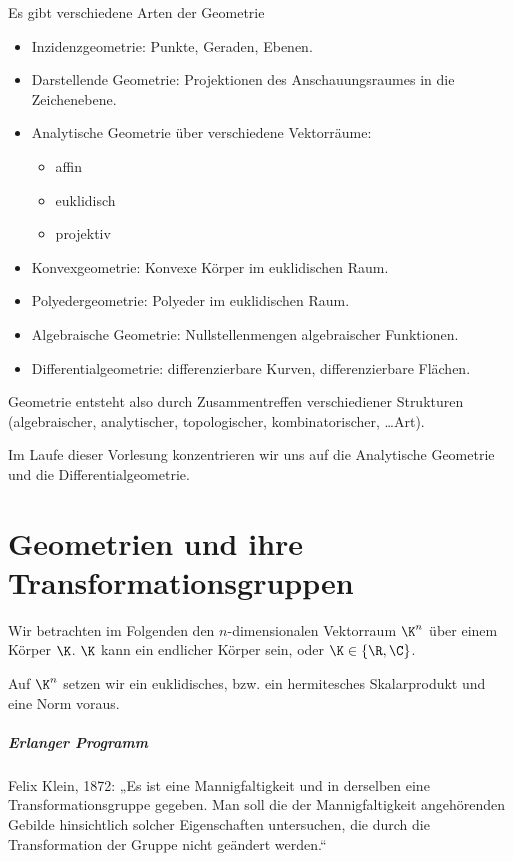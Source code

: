 
Es gibt verschiedene Arten der Geometrie

\begin{itemize}
	\item
		Inzidenzgeometrie: Punkte, Geraden, Ebenen.
	\item
		Darstellende Geometrie: Projektionen des Anschauungsraumes in die Zeichenebene.
	\item
		Analytische Geometrie über verschiedene Vektorräume:
		\begin{itemize}
			\item
				affin
			\item
				euklidisch
			\item
				projektiv
		\end{itemize}
	\item
		Konvexgeometrie: Konvexe Körper im euklidischen Raum.
	\item
		Polyedergeometrie: Polyeder im euklidischen Raum.
	\item
		Algebraische Geometrie: Nullstellenmengen algebraischer Funktionen.
	\item
		Differentialgeometrie: differenzierbare Kurven, differenzierbare Flächen.
\end{itemize}
Geometrie entsteht also durch Zusammentreffen verschiediener Strukturen (algebraischer, analytischer, topologischer, kombinatorischer, \dots Art).

Im Laufe dieser Vorlesung konzentrieren wir uns auf die Analytische Geometrie und die Differentialgeometrie.


\chapter{Geometrien und ihre Transformationsgruppen}


Wir betrachten im Folgenden den $n$-dimensionalen Vektorraum $\K^n$ über einem Körper $\K$.
$\K$ kann ein endlicher Körper sein, oder $\K \in \{\R, \C\}$.

Auf $\K^n$ setzen wir ein euklidisches, bzw. ein hermitesches Skalarprodukt und eine Norm voraus.

\paragraph{Erlanger Programm}

Felix Klein, 1872: „Es ist eine Mannigfaltigkeit und in derselben eine Transformationsgruppe gegeben.
Man soll die der Mannigfaltigkeit angehörenden Gebilde hinsichtlich solcher Eigenschaften untersuchen, die durch die Transformation der Gruppe nicht geändert werden.“

